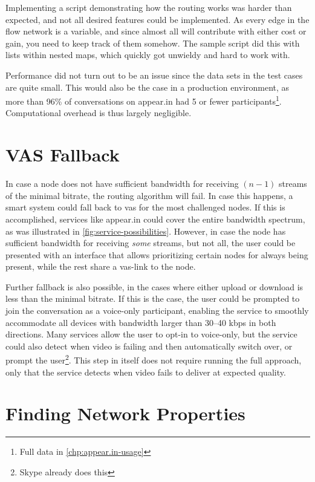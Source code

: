 Implementing a script demonstrating how the routing works was harder than expected, and not all desired features could be implemented. As every edge in the flow network is a variable, and since almost all will contribute with either cost or gain, you need to keep track of them somehow. The sample script did this with lists within nested maps, which quickly got unwieldy and hard to work with.

Performance did not turn out to be an issue since the data sets in the test cases are quite small. This would also be the case in a production environment, as more than 96\% of conversations on appear.in had 5 or fewer participants\footnote{Full data in \autoref{chp:appear.in-usage}}. Computational overhead is thus largely negligible.


\section{VAS Fallback}

In case a node does not have sufficient bandwidth for receiving $(n-1)$ streams of the minimal bitrate, the routing algorithm will fail. In case this happens, a smart system could fall back to \gls{vas} for the most challenged nodes. If this is accomplished, services like appear.in could cover the entire bandwidth spectrum, as was illustrated in \autoref{fig:service-possibilities}. However, in case the node has sufficient bandwidth for receiving \emph{some} streams, but not all, the user could be presented with an interface that allows prioritizing certain nodes for always being present, while the rest share a \gls{vas}-link to the node.

Further fallback is also possible, in the cases where either upload or download is less than the minimal bitrate. If this is the case, the user could be prompted to join the conversation as a voice-only participant, enabling the service to smoothly accommodate all devices with bandwidth larger than 30--40 kbps in both directions. Many services allow the user to opt-in to voice-only, but the service could also detect when video is failing and then automatically switch over, or prompt the user\footnote{Skype already does this}. This step in itself does not require running the full approach, only that the service detects when video fails to deliver at expected quality.


\section{Finding Network Properties}

